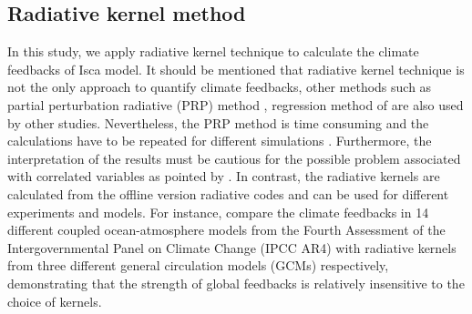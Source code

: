 \subsection{Radiative kernel method}
\label{sec:rad_kernel_method_for_pa}

In this study, we apply radiative kernel  technique \citep{Soden2008,Shell2008} to calculate the climate feedbacks of Isca model. It should be mentioned that radiative kernel technique is not the only approach to quantify climate feedbacks, other methods such as partial perturbation radiative (PRP) method \citep{Wetherald1988cloud}, regression method of \cite{Gregory2004} are also used by other studies. Nevertheless, the PRP method is time consuming and the calculations have to be repeated for different simulations \citep{Shell2008}. Furthermore, the interpretation of the results must be cautious for the possible problem associated with correlated variables as pointed by \cite{Bony2006}. In contrast, the radiative kernels are calculated from the offline version radiative codes and can be used for different experiments and models. For instance, \cite{Soden2008} compare the climate feedbacks in 14 different coupled ocean-atmosphere models from the Fourth Assessment of the Intergovernmental Panel on Climate Change (IPCC AR4) with radiative kernels from three different general circulation models (GCMs) respectively, demonstrating that the strength of global feedbacks is relatively insensitive to the choice of kernels.


